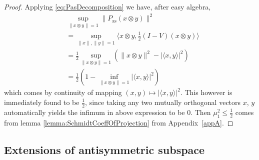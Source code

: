 \documentclass[reqno]{amsart}
\theoremstyle{plain}
\theoremstyle{note}
\begin{document}
\begin{proof}
Applying \eqref{eq:PasDecomposition} we have, after easy algebra,
\begin{align}
    &\sup_{\| x \otimes y\| = 1}{\| P_{\mathrm{as}}(x\otimes y) \|^{2}} \\
    &= \sup_{\|x\|,\|y\|=1}{\langle x\otimes y , \frac{1}{2}(I-V)(x\otimes y) \rangle} \nonumber \\
    &= \frac{1}{2} \sup_{\|x\otimes y\|=1}{\left(\|x\otimes y\|^{2} - |\langle x , y \rangle |^{2}\right)} \nonumber \\
    &= \frac{1}{2} \left( 1 - \inf_{\|x\otimes y\|=1}{|\langle x,y \rangle|^{2}}\right) \nonumber
\end{align}
which comes by continuity of mapping $(x,y)\mapsto |\langle x , y \rangle|^{2}$. This however is immediately found to be $\frac{1}{2}$, since taking any two mutually orthogonal vectors $x$, $y$ automatically yields the infimum in above expression to be 0. Then $\mu_{1}^{2} \leqslant \frac{1}{2}$ comes from lemma \ref{lemma:SchmidtCoeffOfProjection} from Appendix~\ref{appA}.
\end{proof}

\subsection{Extensions of antisymmetric subspace}
\label{Sec:extensions}
\end{document}
